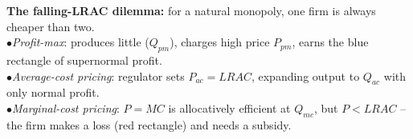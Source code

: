 \documentclass[11pt, a4paper, twoside]{book}
\begin{document}
\begin{diagrambox}
{%
}{%
\textbf{\color{CurveNavy}The falling-LRAC dilemma:} for a natural monopoly, one firm is always cheaper than two.\\[5pt]
$\bullet$\enspace \textit{Profit-max}: produces little ($Q_{pm}$), charges high price $P_{pm}$, earns the blue rectangle of supernormal profit.\\[2pt]
$\bullet$\enspace \textit{Average-cost pricing}: regulator sets $P_{ac}=LRAC$, expanding output to $Q_{ac}$ with only normal profit.\\[2pt]
$\bullet$\enspace \textit{Marginal-cost pricing}: $P=MC$ is allocatively efficient at $Q_{mc}$, but $P<LRAC$ -- the firm makes a loss (red rectangle) and needs a subsidy.%
}
\end{diagrambox}
\end{document}
